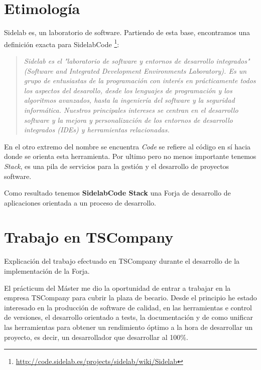 \section{Etimolog\'ia}
\label{sec:etimologia}

\par Sidelab es, un laboratorio de software. Partiendo de esta base, encontramos una definici\'on exacta para SidelabCode \footnote{\url{http://code.sidelab.es/projects/sidelab/wiki/Sidelab}}:

\begin{quotation}
        \emph{Sidelab es el "laboratorio de software y entornos de desarrollo integrados" (Software and Integrated Development Environments Laboratory). Es un grupo de entusiastas de la programaci\'on con inter\'es en pr\'acticamente todos los aspectos del desarollo, desde los lenguajes de programaci\'on y los algoritmos avanzados, hasta la ingenier\'ia del software y la seguridad inform\'atica. Nuestros principales intereses se centran en el desarrollo software y la mejora y personalizaci\'on de los entornos de desarrollo integrados (IDEs) y herramientas relacionadas.}
\end{quotation}

\par En el otro extremo del nombre se encuentra \emph{Code} se refiere al c\'odigo en s\'i hacia donde se orienta esta herramienta. Por ultimo pero no menos importante tenemos \emph{Stack}, es una pila de servicios para la gesti\'on y el desarrollo de proyectos software.

\par Como resultado tenemos \textbf{SidelabCode Stack} una Forja de desarrollo de aplicaciones orientada a un proceso de desarrollo.


\section{Trabajo en TSCompany}
\label{sec:trabajo-tscompany}

\par Explicaci\'on del trabajo efectuado en TSCompany durante el desarrollo de la implementaci\'on de la Forja.

\par El pr\'acticum del M\'aster me dio la oportunidad de entrar a trabajar en la empresa TSCompany para cubrir la plaza de becario. Desde el principio he estado interesado en la producción de software de calidad, en las herramientas e control de versiones, el desarrollo orientado a tests, la documentación y de como unificar las herramientas para obtener un rendimiento óptimo a la hora de desarrollar un proyecto, es decir, un desarrollador que desarrollar al 100\%.

